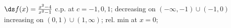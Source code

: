 {$\ds f(x) =\frac{x^2-4}{x^2-1}$
}
{c.p. at $c=-1,0,1$; 
decreasing on $(-\infty,-1)\cup (-1,0)$
increasing on $(0,1)\cup (1,\infty)$;
rel. min at $x=0$;
}

